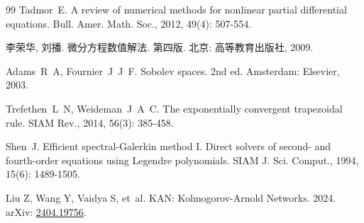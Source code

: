 

\clearpage
{}
{} %

\begin{thebibliography}{99}
 Tadmor~E. A review of numerical methods for nonlinear partial differential equations\allowbreak[J]. Bull. Amer. Math. Soc., 2012, 49(4): 507-554.

 李荣华, 刘播. 微分方程数值解法\allowbreak[M]. 第四版. 北京: 高等教育出版社, 2009.

 Adams~R~A, Fournier~J~J~F. Sobolev spaces\allowbreak[M]. 2nd ed. Amsterdam: Elsevier, 2003.

Trefethen~L~N, Weideman~J~A~C. The exponentially convergent trapezoidal rule\allowbreak[J]. SIAM Rev., 2014, 56(3): 385-458.

 Shen~J. Efficient spectral-Galerkin method I. Direct solvers of second- and fourth-order equations using Legendre polynomials\allowbreak[J]. SIAM J. Sci. Comput., 1994, 15(6): 1489-1505.

 Liu Z, Wang Y, Vaidya S, et~al. KAN: Kolmogorov-Arnold Networks\allowbreak[PP]. 2024. arXiv: \href{https://arxiv.org/abs/2404.19756}{2404.19756}.

\end{thebibliography}

